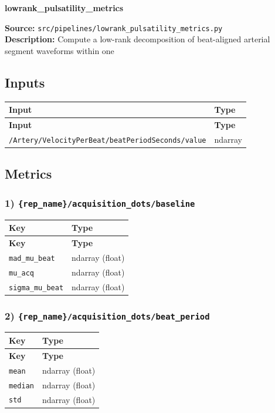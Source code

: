 \documentclass[11pt]{article}
\begin{document}
\begin{center}
\LARGE\textbf{lowrank\_pulsatility\_metrics}
\end{center}
\textbf{Source:} \texttt{src/\allowbreak{}pipelines/\allowbreak{}lowrank\_\allowbreak{}pulsatility\_\allowbreak{}metrics.py}\\
\textbf{Description:} Compute a low-rank decomposition of beat-aligned arterial segment waveforms within one

\subsection*{Inputs}
\begin{longtable}{|p{}|p{}|}
\hline
\textbf{Input} & \textbf{Type} \\ \hline
\endfirsthead
\hline
\textbf{Input} & \textbf{Type} \\ \hline
\endhead
\texttt{/\allowbreak{}Artery/\allowbreak{}VelocityPerBeat/\allowbreak{}beatPeriodSeconds/\allowbreak{}value} & ndarray \\ \hline
\end{longtable}

\subsection*{Metrics}
\subsubsection*{1) \texttt{\{rep\_\allowbreak{}name\}/\allowbreak{}acquisition\_\allowbreak{}dots/\allowbreak{}baseline}}
\begin{longtable}{|p{}|p{}|}
\hline
\textbf{Key} & \textbf{Type} \\ \hline
\endfirsthead
\hline
\textbf{Key} & \textbf{Type} \\ \hline
\endhead
\texttt{mad\_\allowbreak{}mu\_\allowbreak{}beat} & ndarray (float) \\ \hline
\texttt{mu\_\allowbreak{}acq} & ndarray (float) \\ \hline
\texttt{sigma\_\allowbreak{}mu\_\allowbreak{}beat} & ndarray (float) \\ \hline
\end{longtable}

\subsubsection*{2) \texttt{\{rep\_\allowbreak{}name\}/\allowbreak{}acquisition\_\allowbreak{}dots/\allowbreak{}beat\_\allowbreak{}period}}
\begin{longtable}{|p{}|p{}|}
\hline
\textbf{Key} & \textbf{Type} \\ \hline
\endfirsthead
\hline
\textbf{Key} & \textbf{Type} \\ \hline
\endhead
\texttt{mean} & ndarray (float) \\ \hline
\texttt{median} & ndarray (float) \\ \hline
\texttt{std} & ndarray (float) \\ \hline
\end{longtable}
\end{document}
